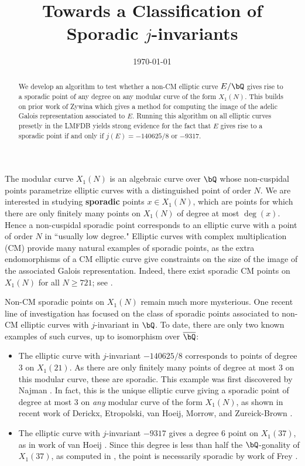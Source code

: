 \documentclass[11pt,reqno]{amsart}
\title{Towards a Classification of Sporadic $j$-invariants}
\date{\today}
\theoremstyle{plain}
\theoremstyle{definition}
\newcommand{\Q}{\bQ}
\begin{document}
\begin{abstract}
We develop an algorithm to test whether a non-CM elliptic curve $E/\Q$ gives rise to a sporadic point of any degree on any modular curve of the form $X_1(N)$. This builds on prior work of Zywina which gives a method for computing the image of the adelic Galois representation associated to $E$. Running this algorithm on all elliptic curves presetly in the LMFDB yields strong evidence for the fact that $E$ gives rise to a sporadic point if and only if $j(E)=-140625/8$ or $-9317$.
    \end{abstract}
\maketitle


The modular curve $X_1(N)$ is an algebraic curve over $\Q$ whose non-cuspidal points parametrize elliptic curves with a distinguished point of order $N$. We are interested in studying \textbf{sporadic} points $x \in X_1(N)$, which are points for which there are only finitely many points on $X_1(N)$ of degree at most $\deg(x)$. Hence a non-cuspidal sporadic point corresponds to an elliptic curve with a point of order $N$ in ``usually low degree." Elliptic curves with complex multiplication (CM) provide many natural examples of sporadic points, as the extra endomorphisms of a CM elliptic curve give constraints on the size of the image of the associated Galois representation. Indeed, there exist sporadic CM points on $X_1(N)$ for all $N\geq 721$; see \cite[Theorem 8.2]{CGPS2022}.

Non-CM sporadic points on $X_1(N)$ remain much more mysterious. One recent line of investigation has focused on the class of sporadic points associated to non-CM elliptic curves with $j$-invariant in $\Q$. To date, there are only two known examples of such curves, up to isomorphism over $\overline{\Q}$:
\begin{itemize}
\item The elliptic curve with $j$-invariant $-140625/8$ corresponds to points of degree 3 on $X_1(21)$. As there are only finitely many points of degree at most 3 on this modular curve, these are sporadic. This example was first discovered by Najman \cite{najman16}. In fact, this is the unique elliptic curve giving a sporadic point of degree at most 3 on \emph{any} modular curve of the form $X_1(N)$, as shown in recent work of Derickx, Etropolski, van Hoeij, Morrow, and Zureick-Brown \cite{DEvHMZB2021}.
\item The elliptic curve with $j$-invariant $-9317$ gives a degree 6 point on $X_1(37)$, as in work of van Hoeij \cite{vanHoeij}. Since this degree is less than half the $\Q$-gonality of $X_1(37)$, as computed in \cite{DerickxVanHoeij2014}, the point is necessarily sporadic by work of Frey \cite{frey}.
\end{itemize}
\end{document}
